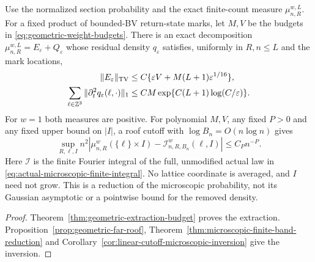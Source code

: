 \begin{maintheorem}
\label{thm:intro-geometric-raw-reduction}
Use the normalized section probability and the exact finite-count
measure $\mu_{n,R}^{w,L}$. For a fixed product of bounded-BV return-state
marks, let $M,V$ be the budgets in \eqref{eq:geometric-weight-budgets}.
There is an exact decomposition $\mu_{n,R}^{w,L}=E_\varepsilon+Q_\varepsilon$
whose residual density $q_\varepsilon$ satisfies, uniformly in $R,n\le L$
and the mark locations,
\begin{align*}
 \|E_\varepsilon\|_{\operatorname{TV}}
    &\le C\{\varepsilon V+M(L+1)\varepsilon^{1/16}\},\\
 \sum_{\ell\in\mathbb Z^3}\|\partial_t^2q_\varepsilon(\ell,\cdot)\|_1
    &\le CM\exp\{C(L+1)\log(C/\varepsilon)\}.
\end{align*}
For $w=1$ both measures are positive. For polynomial $M,V$, any fixed
$P>0$ and any fixed upper bound on $|I|$, a roof cutoff with
$\log B_n=O(n\log n)$ gives
\[
 \sup_{R,\ell,I}n^2\left|
 \mu_{n,R}^w(\{\ell\}\times I)
       -\mathcal I_{n,R,B_n}^{w}(\ell,I)\right|\le C_Pn^{-P}.
\]
Here $\mathcal I$ is the finite Fourier integral of the full, unmodified
actual law in \eqref{eq:actual-microscopic-finite-integral}. No lattice
coordinate is averaged, and $I$ need not grow. This is a reduction of
the microscopic probability, not its Gaussian asymptotic or a pointwise
bound for the removed density.
\end{maintheorem}
\begin{proof}
Theorem~\ref{thm:geometric-extraction-budget} proves the extraction.
Proposition~\ref{prop:geometric-far-roof},
Theorem~\ref{thm:microscopic-finite-band-reduction} and
Corollary~\ref{cor:linear-cutoff-microscopic-inversion} give the inversion.
\end{proof}

